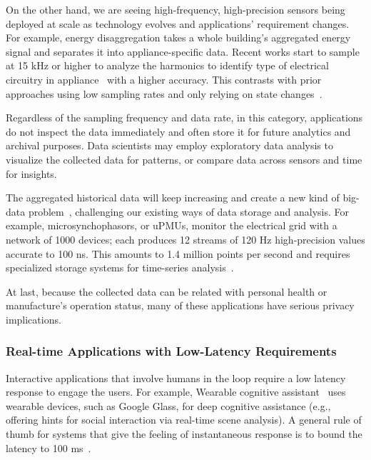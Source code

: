 On the other hand, we are seeing high-frequency, high-precision sensors being
deployed at scale as technology evolves and applications' requirement
changes. For example, energy disaggregation takes a whole building's aggregated
energy signal and separates it into appliance-specific data. Recent works start
to sample at 15 kHz or higher to analyze the harmonics to identify type of
electrical circuitry in appliance~\cite{kolter2011redd} with a higher
accuracy. This contrasts with prior approaches using low sampling rates and only
relying on state changes~\cite{hart1992nonintrusive}.

Regardless of the sampling frequency and data rate, in this category,
applications do not inspect the data immediately and often store it for future
analytics and archival purposes. Data scientists may employ exploratory data
analysis to visualize the collected data for patterns, or compare data across
sensors and time for insights.

The aggregated historical data will keep increasing and create a new kind of
big-data problem~\cite{diaz2012big, zaslavsky2013sensing}, challenging our
existing ways of data storage and analysis. For example, microsynchophasors, or
uPMUs, monitor the electrical grid with a network of 1000 devices; each produces
12 streams of 120 Hz high-precision values accurate to 100 ns. This amounts to
1.4 million points per second and requires specialized storage systems for
time-series analysis~\cite{andersen2016btrdb}.

At last, because the collected data can be related with personal health or
manufacture's operation status, many of these applications have serious privacy
implications.

\subsubsection{Real-time Applications with Low-Latency Requirements}
\label{sec:inter-low-latency}

Interactive applications that involve humans in the loop require a low latency
response to engage the users. For example, Wearable cognitive
assistant~\cite{chen2018application} uses wearable devices, such as Google
Glass, for deep cognitive assistance (e.g., offering hints for social
interaction via real-time scene analysis). A general rule of thumb for systems
that give the feeling of instantaneous response is to bound the latency to 100
ms~\cite{miller1968response, nielsen1994usability}.

